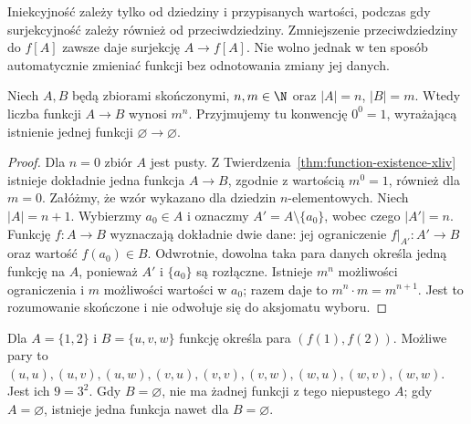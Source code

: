 \begin{uwaga}
Iniekcyjność zależy tylko od dziedziny i przypisanych wartości,
podczas gdy surjekcyjność zależy również od przeciwdziedziny.
Zmniejszenie przeciwdziedziny do $f[A]$ zawsze daje surjekcję
$A\to f[A]$. Nie wolno jednak w ten sposób automatycznie
zmieniać funkcji bez odnotowania zmiany jej danych.
\end{uwaga}



\begin{twierdzenie}
\label{thm:finite-function-count-xliv}
Niech $A,B$ będą zbiorami skończonymi, $n,m\in\N$ oraz
$|A|=n$, $|B|=m$. Wtedy liczba funkcji $A\to B$ wynosi $m^n$. Przyjmujemy tu konwencję
$0^0=1$, wyrażającą istnienie jednej funkcji $\varnothing\to\varnothing$.
\end{twierdzenie}
\begin{proof}
Dla $n=0$ zbiór $A$ jest pusty. Z
Twierdzenia~\ref{thm:function-existence-xliv} istnieje dokładnie jedna
funkcja $A\to B$, zgodnie z wartością $m^0=1$, również dla $m=0$.
Załóżmy, że wzór wykazano dla dziedzin $n$-elementowych.
Niech $|A|=n+1$. Wybierzmy $a_0\in A$ i oznaczmy
$A'=A\setminus\{a_0\}$, wobec czego $|A'|=n$.
Funkcję $f:A\to B$ wyznaczają dokładnie dwie dane:
jej ograniczenie $f|_{A'}:A'\to B$ oraz wartość $f(a_0)\in B$.
Odwrotnie, dowolna taka para danych określa jedną funkcję na $A$,
ponieważ $A'$ i $\{a_0\}$ są rozłączne. Istnieje $m^n$ możliwości
ograniczenia i $m$ możliwości wartości w $a_0$; razem daje to
$m^n\cdot m=m^{n+1}$. Jest to rozumowanie skończone i nie
odwołuje się do aksjomatu wyboru.
\end{proof}
\begin{przyklad}
Dla $A=\{1,2\}$ i $B=\{u,v,w\}$ funkcję określa para
$(f(1),f(2))$. Możliwe pary to
$(u,u),(u,v),(u,w),(v,u),(v,v),(v,w),(w,u),(w,v),(w,w)$.
Jest ich $9=3^2$. Gdy $B=\varnothing$, nie ma żadnej funkcji
z tego niepustego $A$; gdy $A=\varnothing$, istnieje jedna
funkcja nawet dla $B=\varnothing$.
\end{przyklad}

